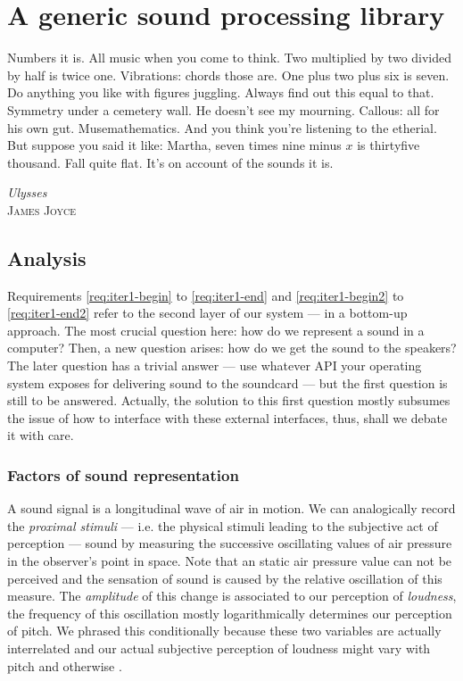 
\chapter{A generic sound processing library}

{
  \setlength{\epigraphwidth}{\textwidth}
  \renewcommand{\textflush}{flushepinormal}
  \epigraph{Numbers it is. All music when you come to think.  Two
    multiplied by two divided by half is twice one.  Vibrations: chords
    those are. One plus two plus six is seven. Do anything you like with
    figures juggling. Always find out this equal to that. Symmetry under
    a cemetery wall. He doesn’t see my mourning. Callous: all for his
    own gut. Musemathematics. And you think you’re listening to the
    etherial. But suppose you said it like: Martha, seven times nine
    minus $x$ is thirtyfive thousand.  Fall quite flat. It’s on account of
    the sounds it is.}{\emph{Ulysses}\\\textsc{James Joyce}}
}

\section{Analysis}

Requirements \ref{req:iter1-begin} to \ref{req:iter1-end} and
\ref{req:iter1-begin2} to \ref{req:iter1-end2} refer to the second
layer of our system --- in a bottom-up approach. The most crucial
question here: how do we represent a sound in a computer? Then, a new
question arises: how do we get the sound to the speakers? The later
question has a trivial answer --- use whatever API your operating
system exposes for delivering sound to the soundcard --- but the first
question is still to be answered. Actually, the solution to this first
question mostly subsumes the issue of how to interface with these
external interfaces, thus, shall we debate it with care.

\subsection{Factors of sound representation}

A sound signal is a longitudinal wave of air in motion. We can
analogically record the \emph{proximal stimuli} --- i.e. the physical
stimuli leading to the subjective act of perception
\cite{goldstein01sensation} --- sound by measuring the successive
oscillating values of air pressure in the observer's point in
space. Note that an static air pressure value can not be perceived and
the sensation of sound is caused by the relative oscillation of this
measure. The \emph{amplitude} of this change is associated to our
perception of \emph{loudness}, the frequency of this oscillation
mostly logarithmically determines our perception of pitch. We phrased
this conditionally because these two variables are actually
interrelated and our actual subjective perception of loudness might
vary with pitch and otherwise \cite{fletcher37loudness}.

